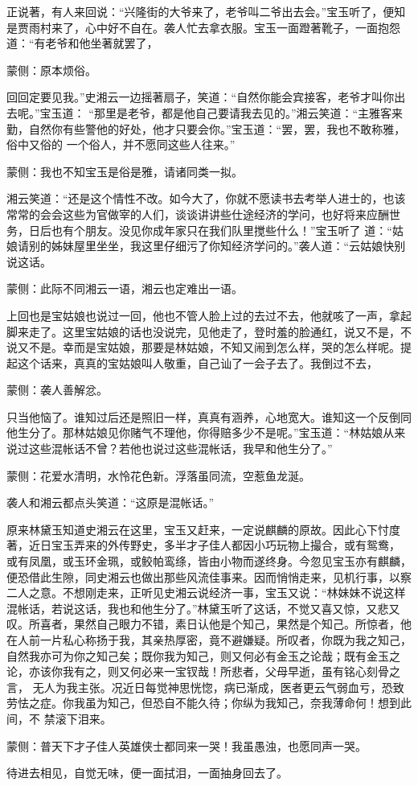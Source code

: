 \begin{parag}
    正说著，有人来回说：“兴隆街的大爷来了，老爷叫二爷出去会。”宝玉听了，便知是贾雨村来了，心中好不自在。袭人忙去拿衣服。宝玉一面蹬著靴子，一面抱怨道：“有老爷和他坐著就罢了，\begin{note}蒙侧：原本烦俗。\end{note}回回定要见我。”史湘云一边摇著扇子，笑道：“自然你能会宾接客，老爷才叫你出去呢。”宝玉道： “那里是老爷，都是他自己要请我去见的。”湘云笑道：“主雅客来勤，自然你有些警他的好处，他才只要会你。”宝玉道：“罢，罢，我也不敢称雅，俗中又俗的 一个俗人，并不愿同这些人往来。”\begin{note}蒙侧：我也不知宝玉是俗是雅，请诸同类一拟。\end{note}湘云笑道：“还是这个情性不改。如今大了，你就不愿读书去考举人进士的，也该常常的会会这些为官做宰的人们，谈谈讲讲些仕途经济的学问，也好将来应酬世务，日后也有个朋友。没见你成年家只在我们队里搅些什么！”宝玉听了 道：“姑娘请别的姊妹屋里坐坐，我这里仔细污了你知经济学问的。”袭人道：“云姑娘快别说这话。\begin{note}蒙侧：此际不同湘云一语，湘云也定难出一语。\end{note}上回也是宝姑娘也说过一回，他也不管人脸上过的去过不去，他就咳了一声，拿起脚来走了。这里宝姑娘的话也没说完，见他走了，登时羞的脸通红，说又不是，不说又不是。幸而是宝姑娘，那要是林姑娘，不知又闹到怎么样，哭的怎么样呢。提起这个话来，真真的宝姑娘叫人敬重，自己讪了一会子去了。我倒过不去，\begin{note}蒙侧：袭人善解忿。\end{note}只当他恼了。谁知过后还是照旧一样，真真有涵养，心地宽大。谁知这一个反倒同他生分了。那林姑娘见你赌气不理他，你得赔多少不是呢。”宝玉道：“林姑娘从来说过这些混帐话不曾？若他也说过这些混帐话，我早和他生分了。”\begin{note}蒙侧：花爱水清明，水怜花色新。浮落虽同流，空惹鱼龙涎。\end{note}袭人和湘云都点头笑道：“这原是混帐话。”
\end{parag}


\begin{parag}
    原来林黛玉知道史湘云在这里，宝玉又赶来，一定说麒麟的原故。因此心下忖度著，近日宝玉弄来的外传野史，多半才子佳人都因小巧玩物上撮合，或有鸳鸯， 或有凤凰，或玉环金珮，或鲛帕鸾绦，皆由小物而遂终身。今忽见宝玉亦有麒麟，便恐借此生隙，同史湘云也做出那些风流佳事来。因而悄悄走来，见机行事，以察二人之意。不想刚走来，正听见史湘云说经济一事，宝玉又说：“林妹妹不说这样混帐话，若说这话，我也和他生分了。”林黛玉听了这话，不觉又喜又惊，又悲又 叹。所喜者，果然自己眼力不错，素日认他是个知己，果然是个知己。所惊者，他在人前一片私心称扬于我，其亲热厚密，竟不避嫌疑。所叹者，你既为我之知己， 自然我亦可为你之知己矣；既你我为知己，则又何必有金玉之论哉；既有金玉之论，亦该你我有之，则又何必来一宝钗哉！所悲者，父母早逝，虽有铭心刻骨之言， 无人为我主张。况近日每觉神思恍惚，病已渐成，医者更云气弱血亏，恐致劳怯之症。你我虽为知己，但恐自不能久待；你纵为我知己，奈我薄命何！想到此间，不 禁滚下泪来。\begin{note}蒙侧：普天下才子佳人英雄侠士都同来一哭！我虽愚浊，也愿同声一哭。\end{note}待进去相见，自觉无味，便一面拭泪，一面抽身回去了。
\end{parag}


